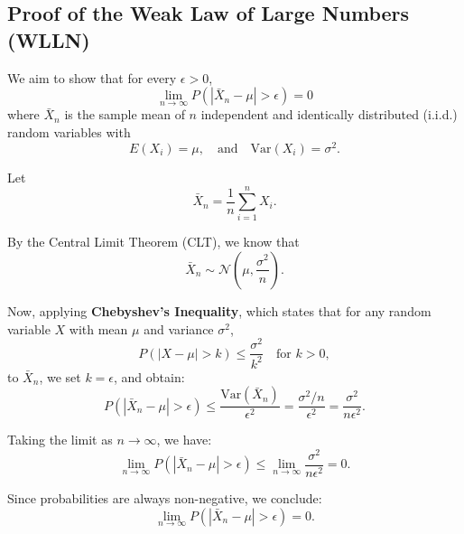 \subsection*{Proof of the Weak Law of Large Numbers (WLLN)}

We aim to show that for every \( \epsilon > 0 \),
\[
\lim_{n \to \infty} P\left( \left| \bar{X}_n - \mu \right| > \epsilon \right) = 0
\]
where \( \bar{X}_n \) is the sample mean of \( n \) independent and identically distributed (i.i.d.) random variables with
\[
E(X_i) = \mu, \quad \text{and} \quad \mathrm{Var}(X_i) = \sigma^2.
\]

Let
\[
\bar{X}_n = \frac{1}{n} \sum_{i=1}^{n} X_i.
\]

By the Central Limit Theorem (CLT), we know that
\[
\bar{X}_n \sim \mathcal{N} \left( \mu, \frac{\sigma^2}{n} \right).
\]

Now, applying \textbf{Chebyshev’s Inequality}, which states that for any random variable \( X \) with mean \( \mu \) and variance \( \sigma^2 \),
\[
P\left( |X - \mu| > k \right) \leq \frac{\sigma^2}{k^2} \quad \text{for } k > 0,
\]
to \( \bar{X}_n \), we set \( k = \epsilon \), and obtain:
\[
P\left( \left| \bar{X}_n - \mu \right| > \epsilon \right) \leq \frac{\mathrm{Var}(\bar{X}_n)}{\epsilon^2} = \frac{\sigma^2 / n}{\epsilon^2} = \frac{\sigma^2}{n \epsilon^2}.
\]

Taking the limit as \( n \to \infty \), we have:
\[
\lim_{n \to \infty} P\left( \left| \bar{X}_n - \mu \right| > \epsilon \right) \leq \lim_{n \to \infty} \frac{\sigma^2}{n \epsilon^2} = 0.
\]

Since probabilities are always non-negative, we conclude:
\[
\lim_{n \to \infty} P\left( \left| \bar{X}_n - \mu \right| > \epsilon \right) = 0.
\]

